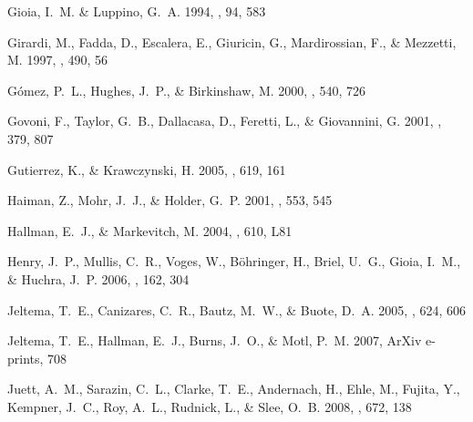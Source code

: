 \documentclass[apj]{emulateapj}
\begin{document}
\begin{thebibliography}{}
{Gioia}, I.~M. \& {Luppino}, G.~A. 1994, \apjs, 94, 583

{Girardi}, M., {Fadda}, D., {Escalera}, E., {Giuricin}, G., {Mardirossian}, F.,
  \& {Mezzetti}, M. 1997, \apj, 490, 56

{G{\'o}mez}, P.~L., {Hughes}, J.~P., \& {Birkinshaw}, M. 2000, \apj, 540, 726

{Govoni}, F., {Taylor}, G.~B., {Dallacasa}, D., {Feretti}, L., \& {Giovannini},
  G. 2001, \aap, 379, 807

{Gutierrez}, K., \& {Krawczynski}, H. 2005, \apj, 619, 161

{Haiman}, Z., {Mohr}, J.~J., \& {Holder}, G.~P. 2001, \apj, 553, 545

{Hallman}, E.~J., \& {Markevitch}, M. 2004, \apjl, 610, L81

{Henry}, J.~P., {Mullis}, C.~R., {Voges}, W., {B{\"o}hringer}, H., {Briel},
  U.~G., {Gioia}, I.~M., \& {Huchra}, J.~P. 2006, \apjs, 162, 304

{Jeltema}, T.~E., {Canizares}, C.~R., {Bautz}, M.~W., \& {Buote}, D.~A. 2005,
  \apj, 624, 606

{Jeltema}, T.~E., {Hallman}, E.~J., {Burns}, J.~O., \& {Motl}, P.~M. 2007,
  ArXiv e-prints, 708

{Juett}, A.~M., {Sarazin}, C.~L., {Clarke}, T.~E., {Andernach}, H., {Ehle}, M.,
  {Fujita}, Y., {Kempner}, J.~C., {Roy}, A.~L., {Rudnick}, L., \& {Slee}, O.~B.
  2008, \apj, 672, 138


\end{thebibliography}
\end{document}
